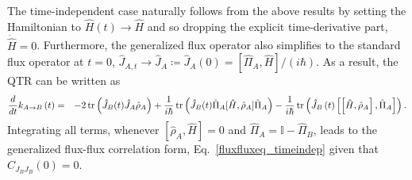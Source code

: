 \documentclass[prl,aps,amssymb,twocolumn,superscriptaddress, notitlepage, longbibliography]{revtex4-2}
\begin{document}
The time-independent case naturally follows from the above results by setting the Hamiltonian to $\hat H(t)\rightarrow\hat H$ and so dropping the explicit time-derivative part, $\dot{\hat H}=0$. Furthermore, the generalized flux operator also simplifies to the standard flux operator at $t=0$, $\hat J_{A,t}\rightarrow \hat J_A\coloneqq \hat J_A(0)=\left[\hat\Pi_A,\hat H\right]/(i\hbar)$. As a result, the QTR can be written as
\begin{eqnarray}
\frac{d}{d t}
k_{A \rightarrow B} \left( t \right)
&=&
-
2 \tr\left(\hat{J}_B(t)

\hat{J}_A
\hat{\rho}_A\right)
+
\frac{1}{i\hbar}
\tr\left(
\hat{J}_B(t) \hat{\Pi}_A[\hat{H}, \hat{\rho}_A]\hat{\Pi}_A
\right)
-
\frac{1}{i \hbar}
\tr \left(
\hat{J}_B \left( t \right)
\left\lbrack
\left\lbrack
\hat{H}
,
\hat{\rho}_A
\right\rbrack
,
\hat{\Pi}_A
\right\rbrack
\right).
\end{eqnarray}
Integrating all terms, whenever $\left[\hat\rho_A,\hat H\right]=0$ and $\hat\Pi_A=\mathbb I-\hat\Pi_B$, leads to the generalized flux-flux correlation form, Eq.~\eqref{fluxfluxeq_timeindep} given that $C_{J_BJ_B}(0)=0$.
\end{document}
